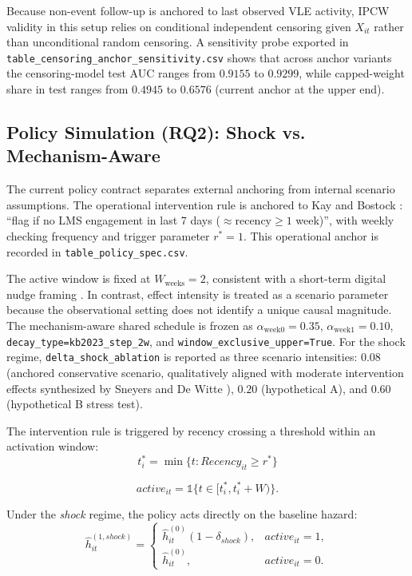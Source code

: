 Because non-event follow-up is anchored to last observed VLE activity, IPCW validity in this setup relies on conditional independent censoring given $X_{it}$ rather than unconditional random censoring. A sensitivity probe exported in \texttt{table\_censoring\_anchor\_sensitivity.csv} shows that across anchor variants the censoring-model test AUC ranges from $0.9155$ to $0.9299$, while capped-weight share in test ranges from $0.4945$ to $0.6576$ (current anchor at the upper end).

\subsection{Policy Simulation (RQ2): Shock vs. Mechanism-Aware}

The current policy contract separates external anchoring from internal scenario assumptions. The operational intervention rule is anchored to Kay and Bostock \cite{KayBostock2023PowerNudge}: ``flag if no LMS engagement in last 7 days ($\approx \text{recency} \ge 1$ week)'', with weekly checking frequency and trigger parameter $r^*=1$. This operational anchor is recorded in \texttt{table\_policy\_spec.csv}.

The active window is fixed at $W_{\text{weeks}}=2$, consistent with a short-term digital nudge framing \cite{KayBostock2023PowerNudge}. In contrast, effect intensity is treated as a scenario parameter because the observational setting does not identify a unique causal magnitude. The mechanism-aware shared schedule is frozen as $\alpha_{\text{week0}}=0.35$, $\alpha_{\text{week1}}=0.10$, \nolinkurl{decay_type=kb2023_step_2w}, and \nolinkurl{window_exclusive_upper=True}. For the shock regime, \nolinkurl{delta_shock_ablation} is reported as three scenario intensities: $0.08$ (anchored conservative scenario, qualitatively aligned with moderate intervention effects synthesized by Sneyers and De Witte \cite{SneyersDeWitte2018InterventionsMeta}), $0.20$ (hypothetical A), and $0.60$ (hypothetical B stress test).

The intervention rule is triggered by recency crossing a threshold within an activation window:
\begin{equation*}
t_i^*=\min\{t: Recency_{it}\ge r^*\}
\end{equation*}

\begin{equation*}
active_{it}=\mathbb{1}\{t\in[t_i^*,t_i^*+W)\}.
\end{equation*}

Under the \textit{shock} regime, the policy acts directly on the baseline hazard:
\begin{equation*}
\hat h^{(1,shock)}_{it}=\begin{cases}
\hat h^{(0)}_{it}(1-\delta_{shock}), & active_{it}=1, \\
\hat h^{(0)}_{it}, & active_{it}=0.
\end{cases}
\end{equation*}

